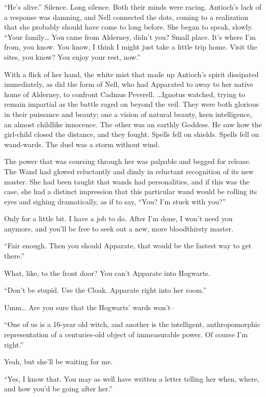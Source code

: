“He’s alive.” Silence. Long silence. Both their minds were racing. Antioch’s lack of a response was damning, and Nell connected the dots, coming to a realization that she probably should have come to long before. She began to speak, slowly. “Your family… You came from Alderney, didn’t you? Small place. It’s where I’m from, you know. You know, I think I might just take a little trip home. Visit the sites, you know? You enjoy your rest, now.”

With a flick of her hand, the white mist that made up Antioch’s spirit dissipated immediately, as did the form of Nell, who had Apparated to away to her native home of Alderney, to confront Cadmus Peverell.
\simpleline
…Ignotus watched, trying to remain impartial as the battle raged on beyond the veil. They were both glorious in their puissance and beauty; one a vision of natural beauty, keen intelligence, an almost childlike innocence. The other was an earthly Goddess. He saw how the girl-child closed the distance, and they fought. Spells fell on shields. Spells fell on wand-wards. The duel was a storm without wind.
\simpleline
{}

The power that was coursing through her was palpable and begged for release. The Wand had glowed reluctantly and dimly in reluctant recognition of its new master. She had been taught that wands had personalities, and if this was the case, she had a distinct impression that this particular wand would be rolling its eyes and sighing dramatically, as if to say, “You? I’m stuck with you?”

Only for a little bit. I have a job to do. After I’m done, I won’t need you anymore, and you’ll be free to seek out a new, more bloodthirsty master.

“Fair enough. Then you should Apparate, that would be the fastest way to get there.”

What, like, to the front door? You can’t Apparate into Hogwarts.

“Don’t be stupid. Use the Cloak. Apparate right into her room.”

Umm… Are you sure that the Hogwarts’ wards won’t–

“One of us is a 16-year old witch, and another is the intelligent, anthropomorphic representation of a centuries-old object of immeasurable power. Of course I’m right.”

Yeah, but she’ll be waiting for me.

“Yes, I know that. You may as well have written a letter telling her when, where, and how you’d be going after her.”

